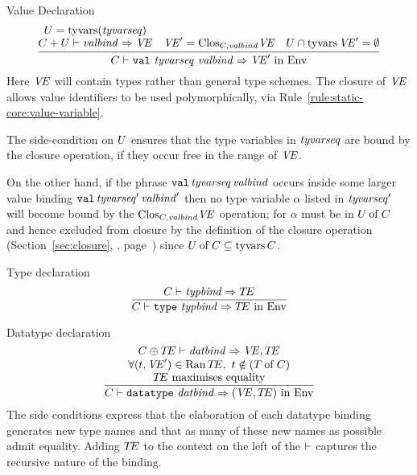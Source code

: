 \begin{inference-rule}{Value Declaration}
\begin{equation}\label{rule:static-core:value-declaration}
  \vcenter{\infer{\C\ts\boxml{val}\ \tyvarseq\ \valbind\ra\VE'\ \In\ \Env}
    {\deduce{\plusmap{\C}{\U}\ts\valbind\ra\VE}{U = \TyVarsFcn (\tyvarseq)}
      & \VE'=\cl{\C,\valbind}{\VE}
      & \U\cap\TyVarFcn\VE'=\emptyset}}
\end{equation}
Here $\textit{V\kern-.05emE\/}$ will contain types rather than general type schemes. The
closure of $\textit{V\kern-.05emE\/}$ allows value identifiers to be used polymorphically,
via Rule~\eqref{rule:static-core:value-variable}.

The side-condition on $U$ ensures that the type variables in
$\textit{tyvarseq\/}$ are bound by the closure operation, if they occur free in
the range of $\textit{V\kern-.05emE\/}$.

On the other hand,
if the phrase $\hbox{\tt val}\,\textit{tyvarseq\/}\,\textit{valbind\/}$ occurs inside
some larger value binding $\hbox{\tt val}\,\textit{tyvarseq\/}'\,\textit{valbind\/}'$
then no type variable $\alpha$ listed in $\textit{tyvarseq\/}'$ will become
bound by the ${\rm Clos}_{C,\textit{valbind\/}}\textit{V\kern-.05emE\/}$ operation; for $\alpha$ must 
be in $U \mathbin{\rm of} C$ and hence excluded from closure by the definition of the closure operation
(Section~\ref{sec:closure}, , page~\pageref{defn:closing-value-environment})
since $U \mathbin{\rm of} C\subseteq\mathop{\rm tyvars}\nolimits C$.
\end{inference-rule}

\begin{inference-rule}{Type declaration}
\begin{equation}\label{rule:static-core:type-declaration}
\vcenter{\infer{\C\ts\typedec\ra\TE\ \In\ \Env}{\C\ts\typbind\ra\TE}}
\end{equation}
\end{inference-rule}

\begin{inference-rule}{Datatype declaration}
\begin{equation}\label{rule:static-core:datatype-declaration}
  \vcenter{\infer{\C\ts\datatypedec\ra(\VE,\TE)\ \In\ \Env}
    {\deduce{\mbox{$\TE$ maximises equality}}
      {\deduce{\forall(\t,\VE')\in\Ran\TE,\ \t\notin(\of{\T}{\C})}
        {\C\oplus\TE\ts\datbind\ra\VE,\TE}}}}
\end{equation}
The side conditions express that the elaboration of each datatype
binding generates new type names and that as many of these new names as
possible admit equality.  Adding $\mbox{$T\!E$}$ to the context on the left of the
$\vdash$ captures the recursive nature of the binding.
\end{inference-rule}

